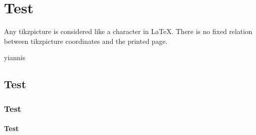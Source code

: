 \documentclass{book}
\begin{document}
\tableofcontents
\mainmatter

\chapter{Test}
\expandafter\epigraph{Any tikzpicture is considered like a character in LaTeX. There is no fixed relation between tikzpicture coordinates and the printed page.}{yiannis}
\lipsum
\section{Test}
\lipsum
\subsection{Test}
\lipsum
\subsubsection{Test}
\lipsum
\end{document}
